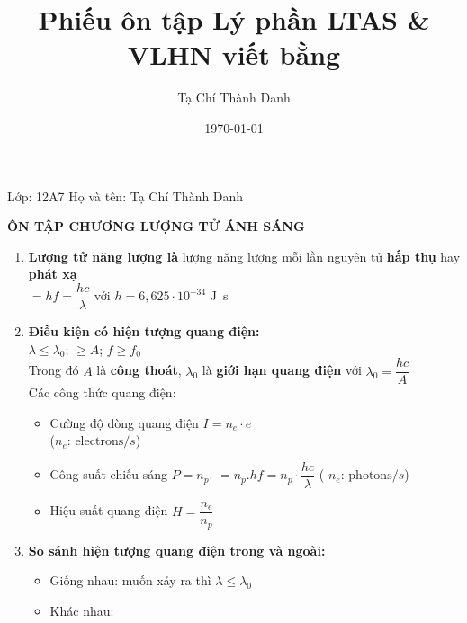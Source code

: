 \documentclass[a4paper,12pt,titlepage,twocolumn]{article}
\title{Phiếu ôn tập Lý phần LTAS \& VLHN viết bằng \textbf{\LaTeXe}}
\date{\today}
\author{Tạ Chí Thành Danh}
\newenvironment{myitemize} 
{ \begin{itemize}[leftmargin=*,label=-]  %
		\setlength{\itemsep}{0pt}
		\setlength{\parskip}{0pt}
		\setlength{\parsep}{0pt}     }
{ \end{itemize}                  }
\newenvironment{myenumerate}
{ \begin{enumerate}[label=\textbf{\arabic*}.]
\setlist{nolistsep} %
\setlength{\itemsep}{0pt}
\setlength{\parskip}{0pt}
\setlength{\parsep}{0pt}	}
{ \end{enumerate}}
\begin{document}
Lớp: 12A7 \quad Họ và tên: Tạ Chí Thành Danh \\
\begin{adjustwidth}{-0.2cm}{}
	\begin{center}
		\small\textbf{ÔN TẬP CHƯƠNG LƯỢNG TỬ ÁNH SÁNG}
	\end{center}
\end{adjustwidth}
\begin{myenumerate}
	\item \textbf{Lượng tử năng lượng là} lượng năng lượng mỗi lần nguyên tử \textbf{hấp thụ} hay \textbf{phát xạ} \\
		\textepsilon{} $=hf=\dfrac{hc}{\lambda}$ với $h=6,625 \cdot 10^{-34}$ \si{\joule\second}
	\item \textbf{Điều kiện có hiện tượng quang điện:} \\
	$\lambda \leqslant \lambda_0$; \textepsilon{} $\geqslant A$; $f \geqslant f_0$ \\
	Trong đó $A$ là \textbf{công thoát}, $\lambda_0$ là \textbf{giới hạn quang điện} với $\lambda_0 = \dfrac{hc}{A}$ \\
	Các công thức quang điện: 
	\begin{myitemize}
	\item[\textbullet]Cường độ dòng quang điện $I = n_e \cdot e$ \\ ($n_e$: $\mathrm{electrons}/s$)
	\item[\textbullet] Công suất chiếu sáng $P=n_p.$\textepsilon{} $=n_p.hf = n_p \cdot \dfrac{hc}{\lambda}$ ( $n_e$: $\mathrm{photons}/s$)
	\item[\textbullet] Hiệu suất quang điện $H = \dfrac{n_e}{n_p}$
	\end{myitemize}
	\item \textbf{So sánh hiện tượng quang điện trong và ngoài:}
	\begin{myitemize}
		\item Giống nhau: muốn xảy ra thì $\lambda \leqslant \lambda_0$
		\item Khác nhau:
	\end{myitemize}
	\begin{adjustwidth}{-1cm}{}
	\renewcommand{\arraystretch}{0} 

\end{adjustwidth}
\end{myenumerate}
\end{document}
